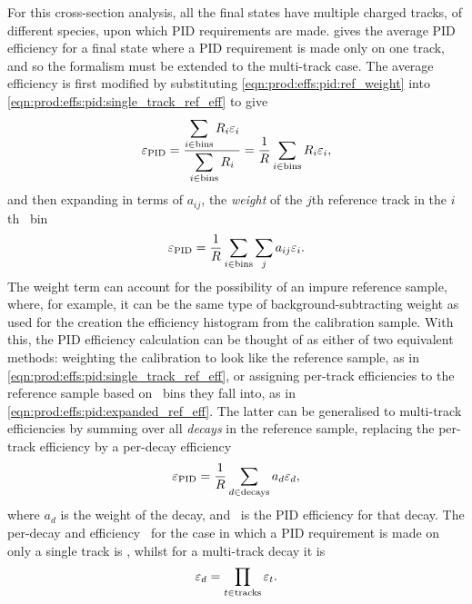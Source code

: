 For this cross-section analysis, all the final states have multiple charged 
tracks, of different species, upon which \ac{PID} requirements are made.
 gives the average \ac{PID} 
efficiency for a final state where a \ac{PID} requirement is made only on one 
track, and so the formalism must be extended to the multi-track case.
The average efficiency is first modified by substituting 
\cref{eqn:prod:effs:pid:ref_weight} into 
\cref{eqn:prod:effs:pid:single_track_ref_eff} to give
\begin{equation}
  \effpid = \frac{%
    \displaystyle\sum_{i \in \textnormal{bins}} R_{i}\eff_{i}
  }{%
    \displaystyle\sum_{i \in \textnormal{bins}} R_{i}
  }
  = \frac{1}{R}\sum_{i \in \textnormal{bins}} R_{i}\eff_{i},
\end{equation}
and then expanding in terms of $a_{ij}$, the \emph{weight} of the $j$th 
reference track in the $i$th \ptotetanspd\ bin
\begin{equation}
  \varepsilon_{\textnormal{PID}} = \frac{1}{R}
            \sum_{i \in \textnormal{bins}}\sum_{j} a_{ij}\varepsilon_{i}.
  \label{eqn:prod:effs:pid:expanded_ref_eff}
\end{equation}
The weight term can account for the possibility of an impure reference sample, 
where, for example, it can be the same type of background-subtracting weight as 
used for the creation the efficiency histogram from the calibration sample.
With this, the \ac{PID} efficiency calculation can be thought of as either of 
two equivalent methods: weighting the calibration to look like the reference 
sample, as in \cref{eqn:prod:effs:pid:single_track_ref_eff}, or assigning 
per-track efficiencies to the reference sample based on \ptotetanspd\ bins they 
fall into, as in \cref{eqn:prod:effs:pid:expanded_ref_eff}.
The latter can be generalised to multi-track efficiencies by summing over all 
\emph{decays} in the reference sample, replacing the per-track efficiency by a 
per-decay efficiency \effpiddecay
\begin{equation}
  \varepsilon_{\textnormal{PID}} = \frac{1}{R}\sum_{d\in\text{decays}} a_{d}\varepsilon_{d},
\end{equation}
where $a_{d}$ is the weight of the decay, and \effpiddecay\ is the \ac{PID} 
efficiency for that decay.
The per-decay and efficiency \effpiddecay\ for the case in which a \ac{PID} 
requirement is made on only a single track is \effpidtrack, whilst for a 
multi-track decay it is
\begin{equation}
  \varepsilon_{d} = \prod_{t \in \textnormal{tracks}} \varepsilon_{t}.
\end{equation}

